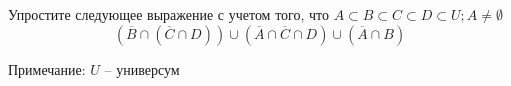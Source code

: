 \question
Упростите следующее выражение с учетом того, что $A\subset B \subset C \subset D \subset U; A \neq \emptyset$
\begin{equation*}
	(\overline{B} \cap (\overline{C} \cap D ))\cup (\overline{A} \cap \overline{C} \cap D) \cup (\overline{A} \cap B)
\end{equation*}

Примечание: $U$ -- универсум